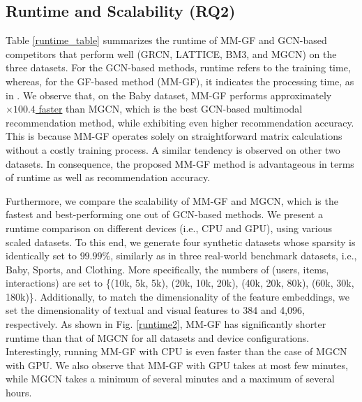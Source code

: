 \documentclass[a4paper,fleqn]{cas-sc}
\renewcommand{\cite}{\citep}
\begin{document}
\subsection{Runtime and Scalability (RQ2)}
Table \ref{runtime_table} summarizes the runtime of \textsf{MM-GF} and GCN-based competitors that perform well (GRCN, LATTICE, BM3, and MGCN) on the three datasets. For the GCN-based methods, runtime refers to the training time, whereas, for the GF-based method (\textsf{MM-GF}), it indicates the processing time, as in \cite{DBLP:conf/cikm/ShenWZSZLL21, DBLP:conf/sigir/ParkSS24}. We observe that, on the Baby dataset, \textsf{MM-GF} performs approximately \underline{$\times100.4$ faster} than MGCN, which is the best GCN-based multimodal recommendation method, while exhibiting even higher recommendation accuracy. This is because \textsf{MM-GF} operates solely on straightforward matrix calculations without a costly training process. A similar tendency is observed on other two datasets. In consequence, the proposed \textsf{MM-GF} method is advantageous in terms of runtime as well as recommendation accuracy.


Furthermore, we compare the scalability of \textsf{MM-GF} and MGCN, which is the fastest and best-performing one out of GCN-based methods. We present a runtime comparison on different devices (i.e., CPU and GPU), using various scaled datasets. To this end, we generate four synthetic datasets whose sparsity is identically set to $99.99\%$, similarly as in three real-world benchmark datasets, i.e., Baby, Sports, and Clothing. More specifically, the numbers of (users, items, interactions) are set to \{(10k, 5k, 5k), (20k, 10k, 20k), (40k, 20k, 80k), (60k, 30k, 180k)\}. Additionally, to match the dimensionality of the feature embeddings, we set the dimensionality of textual and visual features to 384 and 4,096, respectively. As shown in Fig. \ref{runtime2}, \textsf{MM-GF} has significantly shorter runtime than that of MGCN for all datasets and device configurations. Interestingly, running \textsf{MM-GF} with CPU is even faster than the case of MGCN with GPU. We also observe that \textsf{MM-GF} with GPU takes at most few minutes, while MGCN takes a minimum of several minutes and a maximum of several hours.

\end{document}
